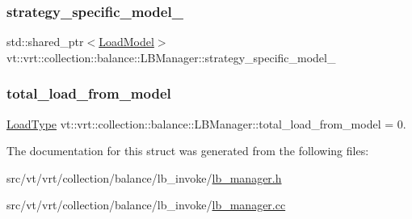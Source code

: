 \subsubsection{\texorpdfstring{strategy\+\_\+specific\+\_\+model\+\_\+}{strategy\_specific\_model\_}}
{\footnotesize\ttfamily std\+::shared\+\_\+ptr$<$\hyperlink{structvt_1_1vrt_1_1collection_1_1balance_1_1_load_model}{Load\+Model}$>$ vt\+::vrt\+::collection\+::balance\+::\+L\+B\+Manager\+::strategy\+\_\+specific\+\_\+model\+\_\+\hspace{0.3cm}{\ttfamily [private]}}

\mbox{\label{structvt_1_1vrt_1_1collection_1_1balance_1_1_l_b_manager_addc8a1fe654a96e4597f596b0debb9d5}} 
\subsubsection{\texorpdfstring{total\+\_\+load\+\_\+from\+\_\+model}{total\_load\_from\_model}}
{\footnotesize\ttfamily \hyperlink{namespacevt_a8fb51741340b87d7aaee0bef60e9896b}{Load\+Type} vt\+::vrt\+::collection\+::balance\+::\+L\+B\+Manager\+::total\+\_\+load\+\_\+from\+\_\+model = 0.\hspace{0.3cm}{\ttfamily [private]}}



The documentation for this struct was generated from the following files\+:\begin{DoxyCompactItemize}
\item 
src/vt/vrt/collection/balance/lb\+\_\+invoke/\hyperlink{lb__manager_8h}{lb\+\_\+manager.\+h}\item 
src/vt/vrt/collection/balance/lb\+\_\+invoke/\hyperlink{lb__manager_8cc}{lb\+\_\+manager.\+cc}\end{DoxyCompactItemize}
